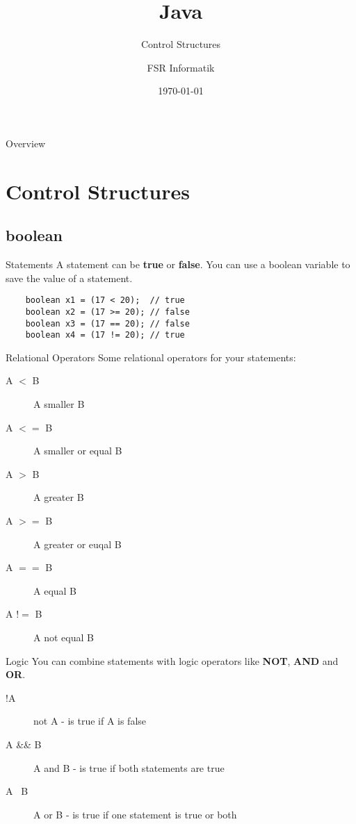 

\title{Java}
\subtitle{Control Structures}
\author{FSR Informatik}
\date{\today}



\begin{frame}
\titlepage
\end{frame}
\begin{frame}{Overview}
\tableofcontents
\end{frame}

\section{Control Structures}
\subsection{boolean}
\begin{frame}[fragile]{Statements}
	A statement can be \textbf{true} or \textbf{false}. 
	You can use a boolean variable to save the value of a statement.
	\begin{lstlisting}
	boolean x1 = (17 < 20);  // true
	boolean x2 = (17 >= 20); // false
	boolean x3 = (17 == 20); // false
	boolean x4 = (17 != 20); // true
	\end{lstlisting}
\end{frame}

\begin{frame}{Relational Operators}
	Some relational operators for your statements:
	\begin{description}
		\item[A $<$ B] A smaller B
		\item[A $<=$ B] A smaller or equal B
		\item[A $>$ B] A greater B
		\item[A $>=$ B] A greater or euqal B
		\item[A $==$ B] A equal B
		\item[A $!=$ B] A not equal B
	\end{description}
\end{frame}

\begin{frame}{Logic}
	You can combine statements with logic operators like \textbf{NOT}, \textbf{AND} and \textbf{OR}.
	\begin{description}
		\item[!A] not A - is true if A is false
		\item[A \&\& B] A and B - is true if both statements are true
		\item[A \textbar\textbar\ B] A or B - is true if one statement is true or both
	\end{description}
\end{frame}

